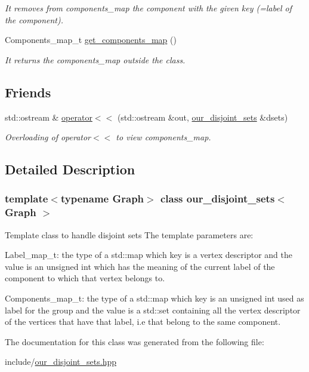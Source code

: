 \begin{DoxyCompactItemize}
\begin{DoxyCompactList}\small\item\em It removes from components\_\-map the component with the given key (=label of the component). \item\end{DoxyCompactList}\item 
\hypertarget{classour__disjoint__sets_a831f31bc0f8765ad8690e61a05a75120}{
Components\_\-map\_\-t \hyperlink{classour__disjoint__sets_a831f31bc0f8765ad8690e61a05a75120}{get\_\-components\_\-map} ()}
\label{classour__disjoint__sets_a831f31bc0f8765ad8690e61a05a75120}

\begin{DoxyCompactList}\small\item\em It returns the components\_\-map outside the class. \item\end{DoxyCompactList}\end{DoxyCompactItemize}
\subsection*{Friends}
\begin{DoxyCompactItemize}
\item 
\hypertarget{classour__disjoint__sets_a9f14f25491fdf5d2a1ce5bc9d76b6d59}{
std::ostream \& \hyperlink{classour__disjoint__sets_a9f14f25491fdf5d2a1ce5bc9d76b6d59}{operator$<$$<$} (std::ostream \&out, \hyperlink{classour__disjoint__sets}{our\_\-disjoint\_\-sets} \&dsets)}
\label{classour__disjoint__sets_a9f14f25491fdf5d2a1ce5bc9d76b6d59}

\begin{DoxyCompactList}\small\item\em Overloading of operator$<$$<$ to view components\_\-map. \item\end{DoxyCompactList}\end{DoxyCompactItemize}


\subsection{Detailed Description}
\subsubsection*{template$<$typename Graph$>$ class our\_\-disjoint\_\-sets$<$ Graph $>$}

Template class to handle disjoint sets  The template parameters are:\par
 Label\_\-map\_\-t: the type of a std::map which key is a vertex descriptor and the value is an unsigned int which has the meaning of the current label of the component to which that vertex belongs to.\par
 Components\_\-map\_\-t: the type of a std::map which key is an unsigned int used as label for the group and the value is a std::set containing all the vertex descriptor of the vertices that have that label, i.e that belong to the same component. 

The documentation for this class was generated from the following file:\begin{DoxyCompactItemize}
\item 
include/\hyperlink{our__disjoint__sets_8hpp}{our\_\-disjoint\_\-sets.hpp}\end{DoxyCompactItemize}
